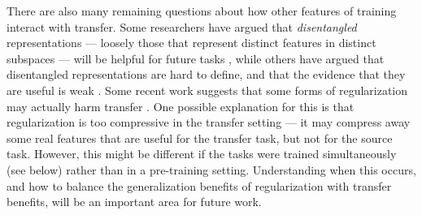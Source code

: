 There are also many remaining questions about how other features of training interact with transfer. Some researchers have argued that \emph{disentangled} representations --- loosely those that represent distinct features in distinct subspaces --- will be helpful for future tasks \citep{Higgins2018}, while others have argued that disentangled representations are hard to define, and that the evidence that they are useful is weak \citep{Locatello2019}. Some recent work suggests that some forms of regularization may actually harm transfer \citep{Kornblith2019}. One possible explanation for this is that regularization is too compressive in the transfer setting --- it may compress away some real features that are useful for the transfer task, but not for the source task. However, this might be different if the tasks were trained simultaneously (see below) rather than in a pre-training setting. Understanding when this occurs, and how to balance the generalization benefits of regularization with transfer benefits, will be an important area for future work. \par

